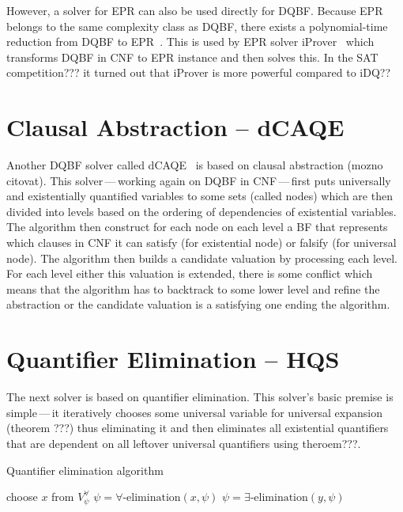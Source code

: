 \documentclass[
  digital, %
  twoside, %
  table,   %
  nolof,     %
  nolot,     %
]{fithesis3}
\theoremstyle{definition}
\theoremstyle{remark}
\begin{document}
However, a solver for EPR can also be used directly for DQBF. Because EPR belongs to the same complexity class as DQBF, there exists a polynomial-time reduction from DQBF to EPR~\cite{iDQandDQDIMACS}. This is used by EPR solver iProver~\cite{iProver} which transforms DQBF in CNF to EPR instance and then solves this. In the SAT competition??? it turned out that iProver is more powerful compared to iDQ??

\section{Clausal Abstraction -- dCAQE}
Another DQBF solver called dCAQE~\cite{dCAQE} is based on clausal abstraction (mozno citovat). This solver\,---\,working again on DQBF in CNF\,---\,first puts universally and existentially quantified variables to some sets (called nodes) which are then divided into levels based on the ordering of dependencies of existential variables. The algorithm then construct for each node on each level a BF that represents which clauses in CNF it can satisfy (for existential node) or falsify (for universal node). The algorithm then builds a candidate valuation by processing each level. For each level either this valuation is extended, there is some conflict which means that the algorithm has to backtrack to some lower level and refine the abstraction or the candidate valuation is a satisfying one ending the algorithm.



\section{Quantifier Elimination -- HQS}
The next solver is based on quantifier elimination. This solver's basic premise is simple\,---\,it iteratively chooses some universal variable for universal expansion (theorem ???) thus eliminating it and then eliminates all existential quantifiers that are dependent on all leftover universal quantifiers using theroem???.

\begin{algorithm}
\caption{Quantifier elimination algorithm}
\label{alg:QE}
\begin{algorithmic}[1]
    \State choose $x$ from $V_{\psi}^{\forall}$
    \State $\psi = \forall\text{-elimination}(x,\psi)$%
        \State $\psi = \exists\text{-elimination}(y,\psi)$%
    \EndFor
\EndWhile
\EndFunction
\end{algorithmic}
\end{algorithm}
\end{document}
